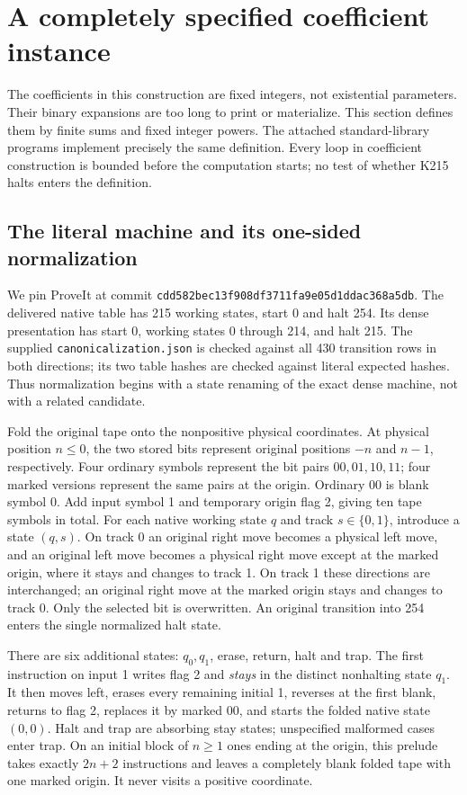 \section{A completely specified coefficient instance}
\label{sec:coefficient-instance}

The coefficients in this construction are fixed integers, not existential
parameters. Their binary expansions are too long to print or materialize.
This section defines them by finite sums and fixed integer powers. The
attached standard-library programs implement precisely the same definition.
Every loop in coefficient construction is bounded before the computation
starts; no test of whether K215 halts enters the definition.

\subsection{The literal machine and its one-sided normalization}

We pin ProveIt at commit
\texttt{cdd582bec13f908df3711fa9e05d1ddac368a5db}.
The delivered native table has 215 working states, start 0 and halt 254.
Its dense presentation has start 0, working states 0 through 214, and halt
215. The supplied \texttt{canonicalization.json} is checked against all
430 transition rows in both directions; its two table hashes are checked
against literal expected hashes. Thus normalization begins with a state
renaming of the exact dense machine, not with a related candidate.

Fold the original tape onto the nonpositive physical coordinates. At
physical position $n\leq0$, the two stored bits represent original
positions $-n$ and $n-1$, respectively. Four ordinary symbols represent
the bit pairs $00,01,10,11$; four marked versions represent the same pairs
at the origin. Ordinary $00$ is blank symbol 0. Add input symbol 1 and
temporary origin flag 2, giving ten tape symbols in total.
For each native working state $q$ and track $s\in\{0,1\}$, introduce a
state $(q,s)$. On track 0 an original right move becomes a physical left
move, and an original left move becomes a physical right move except at
the marked origin, where it stays and changes to track 1. On track 1
these directions are interchanged; an original right move at the marked
origin stays and changes to track 0. Only the selected bit is overwritten.
An original transition into 254 enters the single normalized halt state.

There are six additional states: $q_0,q_1$, erase, return, halt and trap.
The first instruction on input 1 writes flag 2 and \emph{stays} in the
distinct nonhalting state $q_1$. It then moves left, erases every remaining
initial 1, reverses at the first blank, returns to flag 2, replaces it by
marked $00$, and starts the folded native state $(0,0)$. Halt and trap are
absorbing stay states; unspecified malformed cases enter trap.
On an initial block of $n\geq1$ ones ending at the origin, this prelude
takes exactly $2n+2$ instructions and leaves a completely blank folded
tape with one marked origin. It never visits a positive coordinate.

